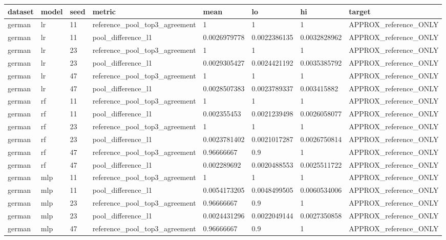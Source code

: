 \begin{tabular}{llllllll}
\toprule
dataset & model & seed & metric & mean & lo & hi & target \\
\midrule
german & lr & 11 & reference\_pool\_top3\_agreement & 1 & 1 & 1 & APPROX\_reference\_ONLY \\
german & lr & 11 & pool\_difference\_l1 & 0.0026979778 & 0.0022386135 & 0.0032828962 & APPROX\_reference\_ONLY \\
german & lr & 23 & reference\_pool\_top3\_agreement & 1 & 1 & 1 & APPROX\_reference\_ONLY \\
german & lr & 23 & pool\_difference\_l1 & 0.0029305427 & 0.0024421192 & 0.0035385792 & APPROX\_reference\_ONLY \\
german & lr & 47 & reference\_pool\_top3\_agreement & 1 & 1 & 1 & APPROX\_reference\_ONLY \\
german & lr & 47 & pool\_difference\_l1 & 0.0028507383 & 0.0023789337 & 0.003415882 & APPROX\_reference\_ONLY \\
german & rf & 11 & reference\_pool\_top3\_agreement & 1 & 1 & 1 & APPROX\_reference\_ONLY \\
german & rf & 11 & pool\_difference\_l1 & 0.002355453 & 0.0021239498 & 0.0026058077 & APPROX\_reference\_ONLY \\
german & rf & 23 & reference\_pool\_top3\_agreement & 1 & 1 & 1 & APPROX\_reference\_ONLY \\
german & rf & 23 & pool\_difference\_l1 & 0.0023781402 & 0.0021017287 & 0.0026750814 & APPROX\_reference\_ONLY \\
german & rf & 47 & reference\_pool\_top3\_agreement & 0.96666667 & 0.9 & 1 & APPROX\_reference\_ONLY \\
german & rf & 47 & pool\_difference\_l1 & 0.002289692 & 0.0020488553 & 0.0025511722 & APPROX\_reference\_ONLY \\
german & mlp & 11 & reference\_pool\_top3\_agreement & 1 & 1 & 1 & APPROX\_reference\_ONLY \\
german & mlp & 11 & pool\_difference\_l1 & 0.0054173205 & 0.0048499505 & 0.0060534006 & APPROX\_reference\_ONLY \\
german & mlp & 23 & reference\_pool\_top3\_agreement & 0.96666667 & 0.9 & 1 & APPROX\_reference\_ONLY \\
german & mlp & 23 & pool\_difference\_l1 & 0.0024431296 & 0.0022049144 & 0.0027350858 & APPROX\_reference\_ONLY \\
german & mlp & 47 & reference\_pool\_top3\_agreement & 0.96666667 & 0.9 & 1 & APPROX\_reference\_ONLY \\

\end{tabular}
